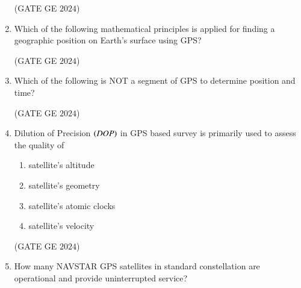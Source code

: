\documentclass[journal,12pt,onecolumn]{IEEEtran}
\theoremstyle{remark}
\begin{document}
\begin{enumerate}
\begin{enumerate}
\end{enumerate}
\hfill{(GATE GE $2024$)}
\bigskip
\item Which 
of the following mathematical principles is applied for finding a geographic position on Earth's surface using GPS?
\begin{enumerate}
\end{enumerate}
\hfill{(GATE GE $2024$)}
\bigskip
\item Which of the following is NOT a segment of GPS to determine position and time?
\begin{enumerate}
\end{enumerate}
\hfill{(GATE GE $2024$)}
\bigskip
\item Dilution of Precision $\left(DOP\right)$ in GPS based survey is primarily used to assess the quality of
\begin{enumerate}
\item satellite's altitude
\item satellite's geometry
\item satellite's atomic clocks
\item satellite's velocity
\end{enumerate}
\hfill{(GATE GE $2024$)}
\bigskip
\item How many NAVSTAR GPS satellites in standard constellation are operational and provide uninterrupted service?
\begin{enumerate}

\end{enumerate}
\end{enumerate}
\end{document}
